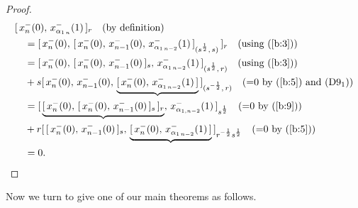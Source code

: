 \documentclass{amsproc}
\theoremstyle{remark}
\numberwithin{equation}{section}
\begin{document}
\begin{proof}
\begin{eqnarray*}
\begin{split}
&[\,x_n^-{(0)},\, x_{\alpha_{1\,n}}^-(1)\,]_{r}
\quad {\hbox{(by definition)}}\\
&\quad=[\,x_n^-(0),\,[\,x_{n}^-(0),\,x_{n-1}^-(0),\,x_{\alpha_{1\,n-2}}^-(1)
\,]_{(s^{\frac{1}{2}},\,s)}\,]_{r}
\quad {\hbox{(using (\ref{b:3}))}}\\
&\quad=[\,x_n^-(0),\,[\,x_{n}^-(0),\,x_{n-1}^-(0)\,]_{s}
,\,x_{\alpha_{1\,n-2}}^-(1)\,]_{(s^{\frac{1}{2}},\,r)}
\quad {\hbox{(using (\ref{b:3}))}}\\
&\quad+s[\,x_n^-(0),\,x_{n-1}^-(0),\,
\underbrace{[\,x_{n}^-(0),\,x_{\alpha_{1\,n-2}}^-(1)\,]}
\,]_{(s^{-\frac{1}{2}},\,r)}\quad {\hbox{(=0 by (\ref{b:5}) and $(\textrm{D9}_1)$)}}\\
&\quad=[\,\underbrace{[\,x_n^-(0),\,[\,x_{n}^-(0),\,x_{n-1}^-(0)\,]_{s}
\,]_{r}}
,\,x_{\alpha_{1,n-2}}^-(1)\,]_{s^{\frac{1}{2}}}\quad {\hbox{(=0 by (\ref{b:9}))}}\\
&\quad+r[\,[\,x_{n}^-(0),\,x_{n-1}^-(0)\,]_{s}
,\,\underbrace{[\,x_{n}^-(0),\,x_{\alpha_{1\,n-2}}^-(1)\,]}
\,]_{r^{-\frac{1}{2}}s^{\frac{1}{2}}}\quad {\hbox{(=0 by (\ref{b:5}))}}\\
&\quad=0.
\end{split}
\end{eqnarray*}
\end{proof}

Now we turn to give one of our main theorems as follows.
\end{document}
